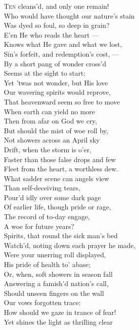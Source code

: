 \textsc{Ten} cleans’d, and only one remain! \\
 Who would have thought our nature’s stain \\
 Was dyed so foul, so deep in grain? \\
 E’en He who reads the heart — \\
 Knows what He gave and what we lost, \\
 Sin’s forfeit, and redemption’s cost, — \\
 By a short pang of wonder cross’d \\
 Seems at the sight to start: \\
  Yet ’twas not wonder, but His love \\
 Our wavering spirits would reprove, \\
 That heavenward seem so free to move \\
 When earth can yield no more \\
 Then from afar on God we cry, \\
 But should the mist of woe roll by, \\
 Not showers across an April sky \\
 Drift, when the storm is o’er, \\
  Faster than those false drops and few \\
 Fleet from the heart, a worthless dew. \\
 What sadder scene can angels view \\
 Than self-deceiving tears, \\
 Pour’d idly over some dark page \\
 Of earlier life, though pride or rage, \\
 The record of to-day engage, \\
 A woe for future years? \\
  Spirits, that round the sick man’s bed \\
 Watch’d, noting down each prayer he made, \\
 Were your unerring roll displayed, \\
 His pride of health to’ abase; \\
 Or, when, soft showers in season fall \\
 Answering a famish’d nation’s call, \\
 Should unseen fingers on the wall \\
 Our vows forgotten trace: \\
  How should we gaze in trance of fear! \\
 Yet shines the light as thrilling clear \\
